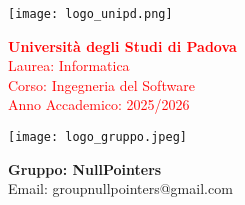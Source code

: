 \begin{minipage}{0.4\textwidth}
    \texttt{[image: logo\_unipd.png]}
\end{minipage}
\begin{minipage}{0.55\textwidth}
    \textcolor{red}{\textbf{Università degli Studi di Padova}} \\
    \textcolor{red}{Laurea: Informatica} \\
    \textcolor{red}{Corso: Ingegneria del Software} \\
    \textcolor{red}{Anno Accademico: 2025/2026}
\end{minipage}

\begin{minipage}{0.4\textwidth}
    \texttt{[image: logo\_gruppo.jpeg]}
\end{minipage}
\begin{minipage}{0.55\textwidth}
    \textbf{Gruppo: NullPointers} \\
    Email: \textsf{groupnullpointers@gmail.com}
\end{minipage}

\vspace{2cm}